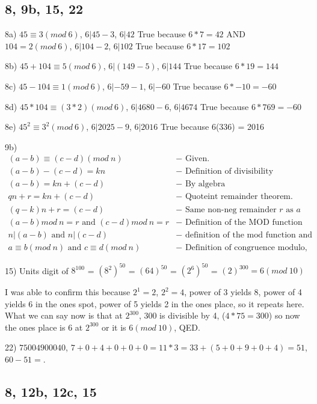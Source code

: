 \documentclass[11pt]{article}
\newcommand*{\mybox}[1]{\framebox{#1}}
\begin{document}
\subsection{8, 9b, 15, 22}
\begin{flushleft}

8a) $45 \equiv 3(mod\ 6)$, $6|45-3$, $6|42$ True because $6*7 = 42$ AND $104 = 2(mod\ 6)$, $6|104-2$, $6|102$ True because $6*17 = 102$

8b) $45+104 \equiv 5(mod\ 6)$, $6|(149-5)$, $6|144$ True because $6*19 = 144$

8c) $45-104 \equiv 1(mod\ 6)$, $6|-59-1$, $6|-60$ True because $6*-10 = -60$

8d) $45*104 \equiv (3*2)(mod\ 6)$, $6|4680-6$, $6|4674$ True because $6*769 = -60$

8e) $45^2 \equiv 3^2(mod\ 6)$, $6| 2025-9$, $6|2016$ True because 6(336) = 2016

\hrulefill

9b) 
\begin{align*}
(a-b)\equiv (c-d)(mod\ n) &- \text{ Given.}\\
(a-b)-(c-d) = kn &- \text{ Definition of divisibility} \\
(a-b)=kn + (c-d) &- \text{ By algebra} \\
qn+r = kn + (c-d) &- \text{ Quoteint remainder theorem.}\\
(q-k)n + r = (c-d) &- \text{ Same non-neg remainder $r$ as $a$}\\
(a-b)mod\ n=r \text{ and }(c-d)mod\ n=r &- \text{ Definition of the MOD function}\\
n|(a-b)\text{ and }n|(c-d) &- \text{ definition of the mod function and algebra}\\
a\equiv b(mod\ n)\text{ and }c\equiv d(mod\ n) &- \text{ Definition of congruence modulo, QED} 
\end{align*}

\hrulefill

15) Units digit of $8^{100}$ = $(8^2)^{50}$ = $(64)^{50}$ = $(2^6)^{50}$ = $(2)^{300} = 6(mod\ 10)$

I was able to confirm this because $2^1 = 2$, $2^2 = 4$, power of 3 yields 8, power of 4 yields 6 in the ones spot, power of 5 yields 2 in the ones place, so it repeats here. What we can say now is that at $2^{300}$, 300 is divisible by 4, ($4*75 = 300$) so now the ones place is 6 at $2^{300}$ or it is $6(mod\ 10)$, QED.

\hrulefill

22) $75004900040$, $7+0+4+0+0+0 = 11 * 3 = 33 + (5+0+9+0+4) = 51$, $60-51 = $\mybox{$9$}.

\hrulefill
\end{flushleft}
\newpage
\subsection{8, 12b, 12c, 15}
\begin{flushleft}

\end{flushleft}
\end{document}
